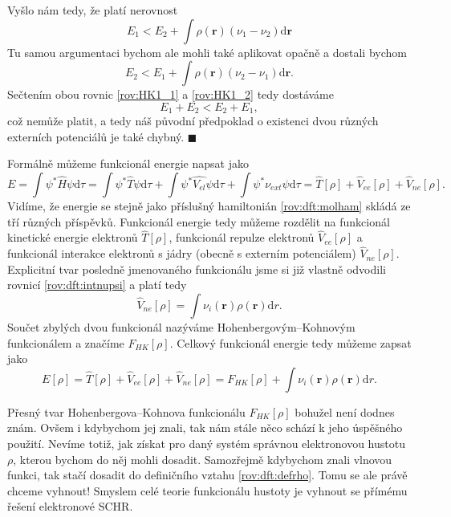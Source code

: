 \noindent Vyšlo nám tedy, že platí nerovnost
\begin{equation}
E_1 < E_2+\int \rho(\mathbf{r})(\nu_1-\nu_2)\mathrm{d}\mathbf{r}
\label{rov:HK1_1}
\end{equation}
Tu samou argumentaci bychom ale mohli také aplikovat opačně a dostali bychom
\begin{equation}
E_2 < E_1+\int \rho(\mathbf{r})(\nu_2-\nu_1)\mathrm{d}\mathbf{r} .
\label{rov:HK1_2}
\end{equation}
Sečtením obou rovnic \eqref{rov:HK1_1} a \eqref{rov:HK1_2} tedy dostáváme
\begin{equation}
E_1 + E_2 < E_2 + E_1 ,
\end{equation}
což nemůže platit, a tedy náš původní předpoklad o existenci dvou různých externích potenciálů je také chybný.
\hfill {\footnotesize $\blacksquare$}

Formálně můžeme funkcionál energie napsat jako
\begin{equation}
E=\int \psi^*\hat{H}\psi \mathrm{d}\tau = \int \psi^*\hat{T}\psi\mathrm{d}\tau + \int \psi^*\hat{V_{el}}\psi\mathrm{d}\tau + \int \psi^*\nu_{ext}\psi\mathrm{d}\tau=\hat{T}[\rho]+\hat{V}_{ee}[\rho]+\hat{V}_{ne}[\rho] .
\end{equation}
Vidíme, že energie se stejně jako příslušný hamiltonián \eqref{rov:dft:molham} skládá ze tří různých příspěvků. Funkcionál energie tedy můžeme rozdělit na funkcionál kinetické energie elektronů $\hat{T}[\rho]$, funkcionál repulze elektronů $\hat{V}_{ee}[\rho]$ a funkcionál interakce elektronů s jádry (obecně s externím potenciálem) $\hat{V}_{ne}[\rho]$. 
Explicitní tvar posledně jmenovaného funkcionálu jsme si již vlastně odvodili rovnicí \eqref{rov:dft:intnupsi} a platí tedy
\begin{equation}
\hat{V}_{ne}[\rho] = \int \nu_i(\textbf{r})\rho(\textbf{r}) \mathrm{d}r .
\end{equation}
Součet zbylých dvou funkcionál nazýváme Hohenbergovým--Kohnovým funkcionálem a značíme $F_{HK}[\rho]$. 
Celkový funkcionál energie tedy můžeme zapsat jako
\begin{equation}
E[\rho] = \hat{T}[\rho]+\hat{V}_{ee}[\rho]+\hat{V}_{ne}[\rho] = F_{HK}[\rho] + \int \nu_i(\textbf{r})\rho(\textbf{r}) \mathrm{d}r .
\end{equation}

Přesný tvar Hohenbergova--Kohnova funkcionálu $F_{HK}[\rho]$ bohužel není dodnes znám. 
Ovšem i kdybychom jej znali, tak nám stále něco schází k jeho úspěšného použití. Nevíme totiž, jak získat pro daný systém správnou elektronovou hustotu $\rho$, kterou bychom do něj mohli dosadit. Samozřejmě kdybychom znali vlnovou funkci, tak stačí dosadit do definičního vztahu \eqref{rov:dft:defrho}. Tomu se ale právě chceme vyhnout! Smyslem celé teorie funkcionálu hustoty je vyhnout se přímému řešení elektronové SCHR.

